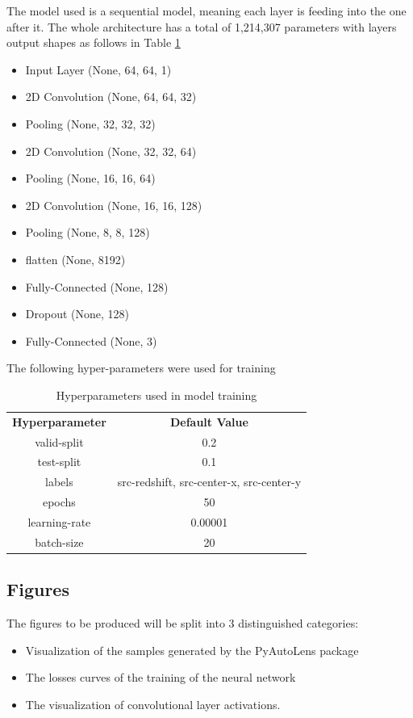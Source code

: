 \documentclass[12pt]{article}
\begin{document}
The model used is a sequential model, meaning each layer is feeding into the one after it. The whole architecture has a total of 1,214,307 parameters with layers output shapes as follows in Table \ref{tab:nn_param}


\begin{itemize}
    \item Input Layer (None, 64, 64, 1)
    \item 2D Convolution (None, 64, 64, 32)
    \item Pooling (None, 32, 32, 32)
    \item 2D Convolution (None, 32, 32, 64)
    \item Pooling (None, 16, 16, 64)
    \item 2D Convolution (None, 16, 16, 128)
    \item Pooling (None, 8, 8, 128)
    \item flatten (None, 8192)
    \item Fully-Connected (None, 128)
    \item Dropout (None, 128)
    \item Fully-Connected (None, 3)
\end{itemize}

The following hyper-parameters were used for training

\begin{table}
    \centering
    \begin{tabular}{c|c}
        
        \textbf{Hyperparameter} & \textbf{Default Value} \\
        
        valid-split & 0.2 \\
        test-split & 0.1 \\
        labels & src-redshift, src-center-x, src-center-y \\
        epochs & 50 \\
        learning-rate & 0.00001 \\
        batch-size & 20 \\
    \end{tabular}
    \caption{Hyperparameters used in model training}
    \label{tab:nn_param}
\end{table}

\subsection{Figures}
The figures to be produced will be split into 3 distinguished categories:
\begin{itemize}
    \item Visualization of the samples generated by the PyAutoLens\cite{pyautolens} package
    \item The losses curves of the training of the neural network
    \item The visualization of convolutional layer activations.
\end{itemize}
\end{document}
